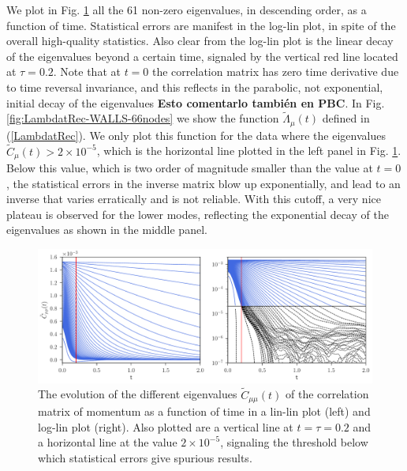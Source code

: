 \documentclass[a4paper,openright,12pt]{book}
\newcommand{\Note}[1]{{\bf \color{red}#1}}    %
\begin{document}
We plot in Fig.  \ref{fig:CtRec-WALLS-66nodes-exp}  all the 61 non-zero eigenvalues, in
descending  order,  as a  function  of  time. Statistical  errors  are
manifest in  the log-lin  plot, in spite  of the  overall high-quality
statistics. Also  clear from the log-lin  plot is the linear  decay of
the eigenvalues  beyond a certain  time, signaled by the  vertical red
line  located at  $\tau=0.2$.   Note that  at  $t=0$ the  correlation
matrix has zero  time derivative due to time  reversal invariance, and
this reflects in the parabolic,  not exponential, initial decay of the
eigenvalues \Note{Esto comentarlo también en PBC}.  In Fig.  \ref{fig:LambdatRec-WALLS-66nodes}  we show
the      function      $\tilde{\Lambda}_{\mu}(t)$      defined      in
(\ref{LambdatRec}). We only plot this  function for the data where the
eigenvalues   $\tilde{C}_{\mu}(t)>2\times10^{-5}$,    which   is   the
horizontal line plotted in the left panel in Fig.  \ref{fig:CtRec-WALLS-66nodes-exp}.  Below this value, which is
two  order  of  magnitude  smaller   than  the  value  at  $t=0$,  the
statistical errors  in the inverse  matrix blow up  exponentially, and
lead to an inverse that varies  erratically and is not reliable.  With
this cutoff,  a very  nice plateau  is observed  for the  lower modes,
reflecting the  exponential decay of  the eigenvalues as shown  in the
middle panel.

\begin{figure}[h!]
  \centering
  \includegraphics[scale=0.45]{CtRec-WALLS-66nodes-exp}
  \caption[Evolution of different eigenvalues $\tilde{C}_{\mu\nu}(t)$ for confined fluid - 66 nodes.]{
  The  evolution of  the different
  eigenvalues  $\tilde{C}_{\mu\mu}(t)$ of  the  correlation matrix  of
  momentum  as  a  function  of   time  in  a  lin-lin  plot  (left)
  and   log-lin   plot
  (right). Also  plotted are  a vertical line  at $t=\tau=0.2$  and a
  horizontal  line  at  the   value  $2\times10^{-5}$,  signaling  the
  threshold below which statistical errors give spurious results. }
\label{fig:CtRec-WALLS-66nodes-exp}
\end{figure}
\end{document}
